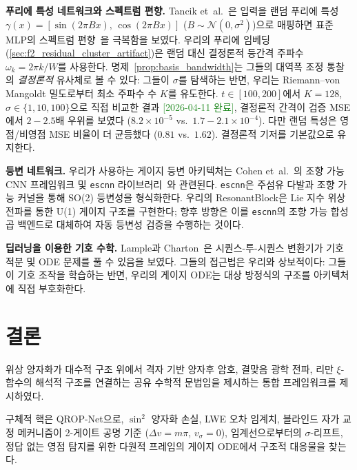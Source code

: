 \documentclass[11pt, a4paper]{article}
\theoremstyle{definition}
\theoremstyle{plain}
\newcommand{\xif}{\xi}
\begin{document}
\smallskip\noindent\textbf{푸리에 특성 네트워크와 스펙트럼 편향.}
Tancik et~al.~\cite{Tancik2020FourierFeatures}은 입력을 랜덤 푸리에 특성
$\gamma(x) = [\sin(2\pi Bx),\,\cos(2\pi Bx)]$
($B\sim\mathcal{N}(0,\sigma^2)$)으로 매핑하면 표준 MLP의 스펙트럼
편향~\cite{Rahaman2019SpectralBias}을 극복함을 보였다.
우리의 푸리에 임베딩 (\cref{sec:f2_residual_cluster_artifact})은 랜덤 대신
결정론적 등간격 주파수 $\omega_k = 2\pi k/W$를 사용한다.
명제~\ref{prop:basis_bandwidth}는 그들의 대역폭 조정 통찰의
\emph{결정론적} 유사체로 볼 수 있다: 그들이 $\sigma$를 탐색하는 반면,
우리는 Riemann--von Mangoldt 밀도로부터 최소 주파수 수 $K$를 유도한다.
$t\in[100,200]$에서 $K=128$, $\sigma\in\{1,10,100\}$으로 직접 비교한 결과
\textcolor{ForestGreen}{[2026-04-11 완료]}, 결정론적 간격이
검증 MSE에서 $2{-}2.5$배 우위를 보였다
($8.2\times10^{-5}$ vs.\ $1.7{-}2.1\times10^{-4}$).
다만 랜덤 특성은 영점/비영점 MSE 비율이 더 균등했다
($0.81$ vs.\ $1.62$). 결정론적 기저를 기본값으로 유지한다.

\smallskip\noindent\textbf{등변 네트워크.}
우리가 사용하는 게이지 등변 아키텍처는 Cohen et~al.~\cite{Cohen2019Gauge}의
조향 가능 CNN 프레임워크 및 \texttt{escnn}
라이브러리~\cite{Cesa2022ESCNN}와 관련된다. \texttt{escnn}은 주섬유
다발과 조향 가능 커널을 통해 SO(2) 등변성을 형식화한다.
우리의 ResonantBlock은 Lie 지수 위상 전파를 통한 U(1) 게이지 구조를
구현한다; 향후 방향은 이를 \texttt{escnn}의 조향 가능 합성곱 백엔드로
대체하여 자동 등변성 검증을 수행하는 것이다.

\smallskip\noindent\textbf{딥러닝을 이용한 기호 수학.}
Lample과 Charton~\cite{Lample2020SymbolicMath}은 시퀀스-투-시퀀스
변환기가 기호 적분 및 ODE 문제를 풀 수 있음을 보였다.
그들의 접근법은 우리와 상보적이다: 그들이 기호 조작을 학습하는 반면,
우리의 게이지 ODE는 대상 방정식의 구조를 아키텍처에 직접 부호화한다.

\section{결론}
\label{sec:conclusion}

위상 양자화가 대수적 구조 위에서 격자 기반 양자후 암호, 결맞음 광학 전파, 리만 $\xif$-함수의 해석적 구조를 연결하는 공유 수학적 문법임을 제시하는 통합 프레임워크를 제시하였다.

구체적 핵은 QROP-Net으로, $\sin^2$ 양자화 손실, LWE 오차 임계치, 블라인드 자가 교정 메커니즘이 2-게이트 공명 기준 ($\Delta v = m\pi$, $v_\sigma = 0$), 임계선으로부터의 $\sigma$-리프트, 정답 없는 영점 탐지를 위한 다원적 프레임의 게이지 ODE에서 구조적 대응물을 찾는다.
\end{document}
